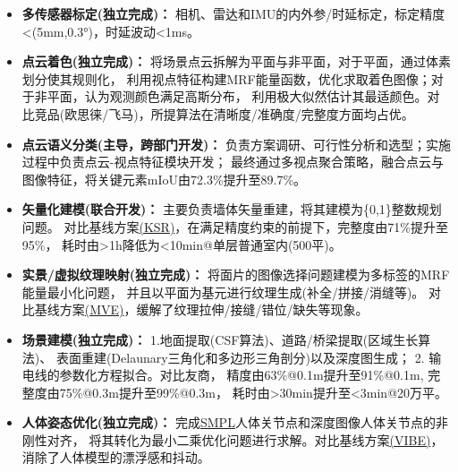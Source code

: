 \begin{itemize}[topsep=0pt, left=1em, itemsep=1.5pt]
  \item \textbf{多传感器标定(独立完成)：}
  相机、雷达和IMU的内外参/时延标定，标定精度<(5mm,0.3°)，时延波动<1ms。
  \item \textbf{点云着色(独立完成)：}
  将场景点云拆解为平面与非平面，对于平面，通过体素划分使其规则化，
  利用视点特征构建MRF能量函数，优化求取着色图像；对于非平面，认为观测颜色满足高斯分布，
  利用极大似然估计其最适颜色。对比竞品(欧思徕/飞马)，所提算法在清晰度/准确度/完整度方面均占优。
  \item \textbf{点云语义分类(主导，跨部门开发)：}
  负责方案调研、可行性分析和选型；实施过程中负责点云-视点特征模块开发；
  最终通过多视点聚合策略，融合点云与图像特征，将关键元素mIoU由72.3\%提升至89.7\%。
  \item \textbf{矢量化建模(联合开发)：}
  主要负责墙体矢量重建，将其建模为\{0,1\}整数规划问题。
  对比基线方案\href{https://inria.hal.science/hal-02924409}{(KSR)}，在满足精度约束的前提下，完整度由71\%提升至95\%，
  耗时由>1h降低为<10min@单层普通室内(500平)。
  \item \textbf{实景/虚拟纹理映射(独立完成)：}
  将面片的图像选择问题建模为多标签的MRF能量最小化问题，
  并且以平面为基元进行纹理生成(补全/拼接/消缝等)。
  对比基线方案\href{https://github.com/nmoehrle/mvs-texturing}{(MVE)}，缓解了纹理拉伸/接缝/错位/缺失等现象。
\end{itemize}

\begin{itemize}[topsep=0pt, left=1em]
  \item \textbf{场景建模(独立完成)：}
  1.地面提取(CSF算法)、道路/桥梁提取(区域生长算法)、
  表面重建(Delaunary三角化和多边形三角剖分)以及深度图生成；
  2. 输电线的参数化方程拟合。对比友商，
  精度由63\%@0.1m提升至91\%@0.1m, 完整度由75\%@0.3m提升至99\%@0.3m，
  耗时由>30min提升至<3min@20万平。
\end{itemize}

\begin{itemize}[topsep=0pt, left=1em]
  \item \textbf{人体姿态优化(独立完成)：}
  完成\href{https://smpl.is.tue.mpg.de/}{SMPL}人体关节点和深度图像人体关节点的非刚性对齐，
  将其转化为最小二乘优化问题进行求解。对比基线方案\href{https://github.com/mkocabas/VIBE}{(VIBE)}，
  消除了人体模型的漂浮感和抖动。
\end{itemize}

